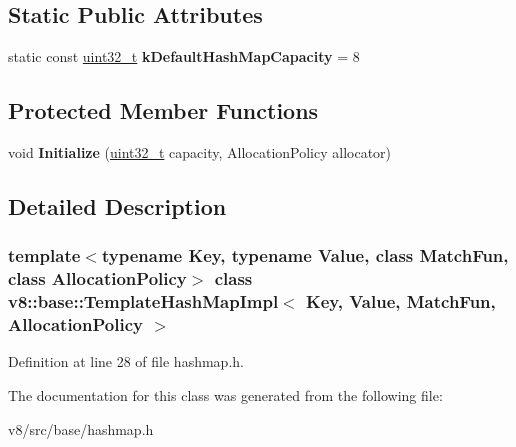 \subsection*{Static Public Attributes}
\begin{DoxyCompactItemize}
\item 
\mbox{\label{classv8_1_1base_1_1TemplateHashMapImpl_a38c7073d5e1a1fd3ccb1b8c64f4dbcb6}} 
static const \mbox{\hyperlink{classuint32__t}{uint32\+\_\+t}} {\bfseries k\+Default\+Hash\+Map\+Capacity} = 8
\end{DoxyCompactItemize}
\subsection*{Protected Member Functions}
\begin{DoxyCompactItemize}
\item 
\mbox{\label{classv8_1_1base_1_1TemplateHashMapImpl_aa317497d1344c4c3107761784c8bdd6d}} 
void {\bfseries Initialize} (\mbox{\hyperlink{classuint32__t}{uint32\+\_\+t}} capacity, Allocation\+Policy allocator)
\end{DoxyCompactItemize}


\subsection{Detailed Description}
\subsubsection*{template$<$typename Key, typename Value, class Match\+Fun, class Allocation\+Policy$>$\newline
class v8\+::base\+::\+Template\+Hash\+Map\+Impl$<$ Key, Value, Match\+Fun, Allocation\+Policy $>$}



Definition at line 28 of file hashmap.\+h.



The documentation for this class was generated from the following file\+:\begin{DoxyCompactItemize}
\item 
v8/src/base/hashmap.\+h\end{DoxyCompactItemize}
